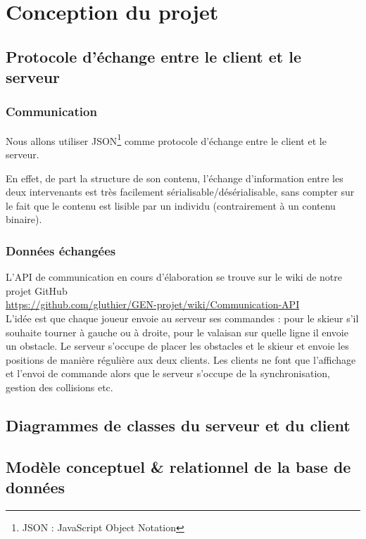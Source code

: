 \documentclass[a4paper,12pt]{article}
\begin{document}
	
	\section{Conception du projet}
	
	
	\subsection{Protocole d'échange entre le client et le serveur}
	\subsubsection{Communication}
	Nous allons utiliser JSON\footnote{JSON : JavaScript Object Notation} comme protocole d'échange entre le client et le serveur. \par
	En effet, de part la structure de son contenu, l'échange d'information entre les deux intervenants est très facilement sérialisable/désérialisable, sans compter sur le fait que le contenu est lisible par un individu (contrairement à un contenu binaire).
	
	\subsubsection{Données échangées}
	L'API de communication en cours d'élaboration se trouve sur le wiki de notre projet GitHub \\ \url{https://github.com/gluthier/GEN-projet/wiki/Communication-API} \\
	L'idée est que chaque joueur envoie au serveur ses commandes : pour le skieur s'il souhaite tourner à gauche ou à droite, pour le valaisan sur quelle ligne il envoie un obstacle. Le serveur s'occupe de placer les obstacles et le skieur et envoie les positions de manière régulière aux deux clients. Les clients ne font que l'affichage et l'envoi de commande alors que le serveur s'occupe de la synchronisation, gestion des collisions etc.
	
	
	\subsection{Diagrammes de classes du serveur et du client}
	
	\subsection{Modèle conceptuel \& relationnel de la base de données}
	
\end{document}
